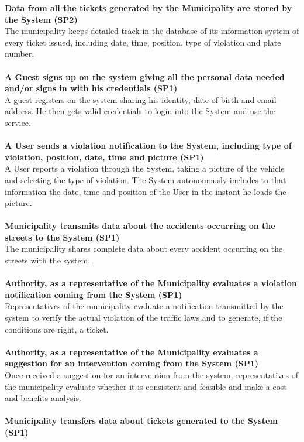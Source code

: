 \documentclass {article}
\begin{document}
	{\bf Data from all the tickets generated by the Municipality are stored by the System (SP2)}\\
		The municipality keeps detailed track in the database of its information system of every ticket issued, including date, time, position, type of violation and plate number.\\ \\
	{\bf A Guest signs up on the system giving all the personal data needed and/or signs in with his credentials  (SP1)} \\
		A guest registers on the system sharing his identity, date of birth and email address. He then gets valid credentials to login into the System and use the service. \\ \\
	{\bf A User sends a violation notification to the System, including type of violation, position, date, time and picture (SP1)} \\
		A User reports a violation through the System, taking a picture of the vehicle and selecting the type of violation. The System autonomously includes to that information the date, time and position of the User in the instant he loads the picture. \\ \\
	{\bf Municipality transmits data about the accidents occurring on the streets to the System (SP1)}\\
		The municipality shares complete data about every accident occurring on the streets with the system.\\ \\
	{\bf Authority, as a representative of the Municipality evaluates a violation notification coming from the System (SP1)}\\ 
		Representatives of the municipality evaluate a notification transmitted by the system to verify the actual violation of the traffic laws and to generate, if the conditions are right, a ticket. \\ \\
	{\bf  Authority, as a representative of the Municipality evaluates a suggestion for an intervention coming from the System (SP1)}\\ 
		Once received a suggestion for an intervention from the system, representatives of the municipality evaluate whether it is consistent and feasible and make a cost and benefits analysis.\\ \\
	{\bf Municipality transfers data about tickets generated to the System (SP1)}\\
\end{document}
